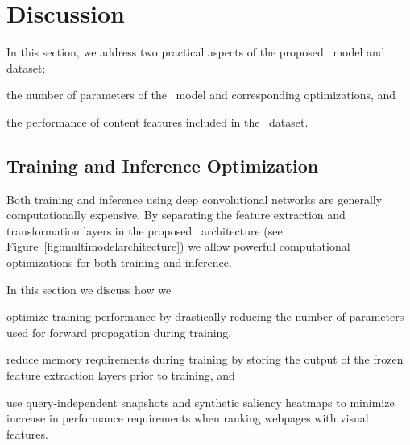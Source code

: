
\section{Discussion}
\label{sec:discussion}
In this section, we address two practical aspects of the proposed \modelname~model and dataset:
\begin{inparaenum}[(i)]
    \item the number of parameters of the \modelname~model and corresponding optimizations, and
    \item the performance of content features included in the \datasetname~dataset.
\end{inparaenum}


\subsection{Training and Inference Optimization} \label{sec:sectionoptimalization}
Both training and inference using deep convolutional networks are generally computationally expensive.
By separating the feature extraction and transformation layers in the proposed \modelname~architecture (see Figure~\ref{fig:multimodelarchitecture}) we allow powerful computational optimizations for both training and inference. 


In this section we discuss how we 
\begin{inparaenum}[(i)]
    \item optimize training performance by drastically reducing the number of parameters used for forward propagation during training, 
    \item reduce memory requirements during training by storing the output of the frozen feature extraction layers prior to training, and
    \item use query-independent snapshots and synthetic saliency heatmaps to minimize increase in performance requirements when ranking webpages with visual features.
\end{inparaenum}

